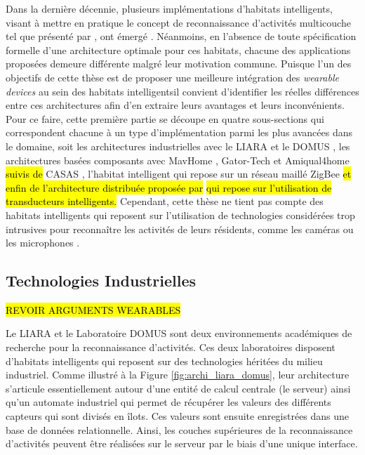 Dans la dernière décennie, plusieurs implémentations d'habitats intelligents, visant à mettre en pratique le concept de reconnaissance d'activités multicouche tel que présenté par \cite{Roy2013}, ont émergé \citep{DJCook2003, Helal2005, Giroux2009, Cook2013, Bouchard2014, Lago2017}. Néanmoins, en l'absence de toute spécification formelle d'une architecture optimale pour ces habitats, chacune des applications proposées demeure différente malgré leur motivation commune. Puisque l'un des objectifs de cette thèse est de proposer une meilleure intégration des \textit{wearable devices} au sein des habitats intelligents\textemdash il convient d'identifier les réelles différences entre ces architectures afin d'en extraire leurs avantages et leurs inconvénients. Pour ce faire, cette première partie se découpe en quatre sous-sections qui correspondent chacune à un type d'implémentation parmi les plus avancées dans le domaine, soit les architectures industrielles avec le \acs{LIARA} \citep{Bouchard2014} et le \acs{DOMUS} \citep{Giroux2009}, les architectures basées composants avec MavHome \citep{DJCook2003}, Gator-Tech \citep{Helal2005} et Amiqual4home \citep{Lago2017} \hl{suivis de} CASAS \citep{Cook2013}, l'habitat intelligent qui repose sur un réseau maillé ZigBee \hl{et enfin de l'architecture distribuée proposée par} \cite{Plantevin2018} \hl{qui repose sur l'utilisation de transducteurs intelligents.} Cependant, cette thèse ne tient pas compte des habitats intelligents qui reposent sur l'utilisation de technologies considérées trop intrusives pour reconnaître les activités de leurs résidents, comme les caméras ou les microphones \citep{Brumitt2000, Vacher2011}.

\subsection{Technologies Industrielles}

\hl{REVOIR ARGUMENTS WEARABLES}

Le \acs{LIARA} \citep{Bouchard2014} et le Laboratoire \acs{DOMUS} \citep{Giroux2009} sont deux environnements académiques de recherche pour la reconnaissance d'activités. Ces deux laboratoires disposent d'habitats intelligents qui reposent sur des technologies héritées du milieu industriel. Comme illustré à la Figure \ref{fig:archi_liara_domus}, leur architecture s'articule essentiellement autour d'une entité de calcul centrale (le serveur) ainsi qu'un automate industriel qui permet de récupérer les valeurs des différents capteurs qui sont divisés en îlots. Ces valeurs sont ensuite enregistrées dans une base de données relationnelle. Ainsi, les couches supérieures de la reconnaissance d'activités peuvent être réalisées sur le serveur par le biais d'une unique interface.

